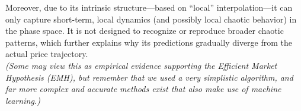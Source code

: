 \begin{itemize}
   Moreover, due to its intrinsic structure—based on “local” interpolation—it can only capture short-term, local dynamics (and possibly local chaotic behavior) in the phase space. It is not designed to recognize or reproduce broader chaotic patterns, which further explains why its predictions gradually diverge from the actual price trajectory.\\
   
    \textit{(Some may view this as empirical evidence supporting the Efficient Market Hypothesis (EMH), but remember that we used a very simplistic algorithm, and far more complex and accurate methods exist that also make use of machine learning.)}
\end{itemize}